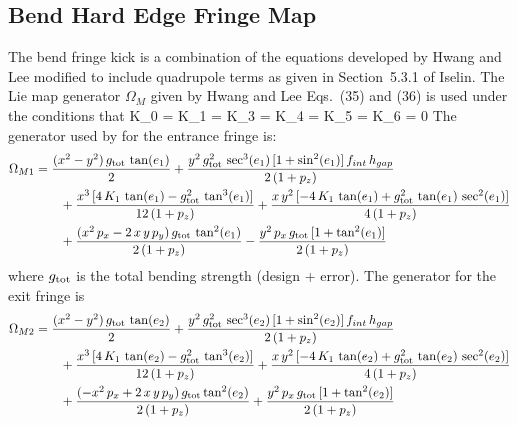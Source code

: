 \subsection{Bend Hard Edge Fringe Map}
\label{s:fringe.bend.hard}

The bend fringe kick is a combination of the equations developed by Hwang and Lee\cite{b:hwang}
modified to include quadrupole terms as given in Section~5.3.1 of Iselin\cite{b:madphysics}.
The Lie map generator $\Omega_M$ given by Hwang and Lee Eqs.~(35) and (36) is used under
the conditions that
\Begineq
  K_0 = K_1 = K_3 = K_4 = K_5 = K_6 = 0
\Endeq
The generator used by \bmad for the entrance fringe is:
\begin{align}
  \Omega_{M1} &= \frac{(x^2 - y^2) \, g_{\text{tot}} \, \tan (e_1)}{2} 
  + \frac{y^2 \, g_{\text{tot}}^2 \, \sec^3 (e_1) \, [1 + \sin^2 (e_1)] \, f_{int} \,  h_{gap}}{2 \, (1 + p_z)} \nonumber \\
  & \qquad + \frac{x^3 \, [4 \, K_1 \, \tan (e_1) - g_{\text{tot}}^2 \, \tan^3 (e_1)]}{12 \, (1 + p_z)}
  + \frac{x \, y^2 \, [-4 \, K_1 \, \tan (e_1) + g_{\text{tot}}^2 \, \tan (e_1) \, \sec^2 (e_1)]}{4 \, (1 + p_z)} \\
  &\qquad + \frac{(x^2 \, p_x - 2 \, x \, y \, p_y) \, g_{\text{tot}} \, \tan^2 (e_1)}{2 \, (1 + p_z)}
  - \frac{y^2 \, p_x \, g_{\text{tot}} \, [1 + \tan^2 (e_1)]}{2 \, (1 + p_z)} \nonumber
\end{align}
where $g_{\text{tot}}$ is the total bending strength (design + error).
The generator for the exit fringe is
\begin{align}
  \Omega_{M2} &= \frac{(x^2 - y^2) \, g_{\text{tot}} \, \tan (e_2)}{2} 
  + \frac{y^2 \, g_{\text{tot}}^2 \, \sec^3 (e_2) \, [1 + \sin^2 (e_2)] \, f_{int} \,  h_{gap}}{2 \, (1 + p_z)} \nonumber \\
  &\qquad + \frac{x^3 \, [4 \, K_1 \, \tan (e_2) - g_{\text{tot}}^2 \, \tan^3 (e_2)]}{12 \, (1 + p_z)}
  + \frac{x \, y^2 \, [-4 \, K_1 \, \tan (e_2) + g_{\text{tot}}^2 \, \tan (e_2) \, \sec^2 (e_2)]}{4 \, (1+p_z)} \\
  &\qquad + \frac{(-x^2 \, p_x + 2 \, x \, y \, p_y) \, g_{\text{tot}} \tan^2 (e_2)}{2 \, (1 + p_z)}
  + \frac{y^2 \, p_x \, g_{\text{tot}} \, [1 + \tan^2 (e_2)]}{2 \, (1 + p_z)} \nonumber
\end{align}

